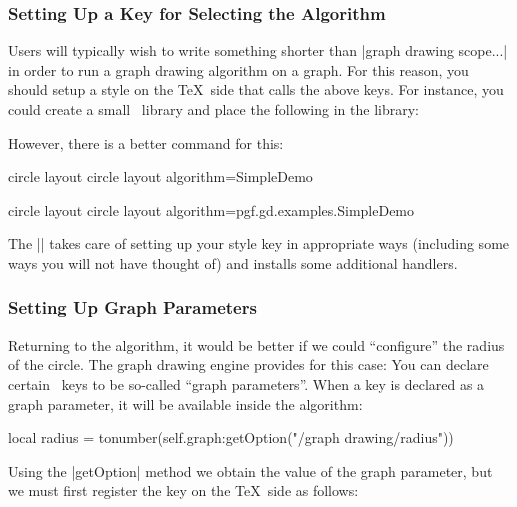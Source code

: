 \subsubsection{Setting Up a Key for Selecting the Algorithm}

Users will typically wish to write something shorter than
|graph drawing scope...| in order to run a graph drawing algorithm on
a graph. For this reason, you should setup a style on the \TeX\ side
that calls the above keys. For instance, you could create a small
\tikzname\ library and place the following in the library:

\begin{codeexample}
\end{codeexample}

However, there is a better command for this:

\begin{codeexample}[code only]
\pgfgddeclarealgorithmkey
{circle layout}
{circle layout}
{algorithm=SimpleDemo}
\end{codeexample}
\pgfgddeclarealgorithmkey
{circle layout}
{circle layout}
{algorithm=pgf.gd.examples.SimpleDemo}

The |\pgfgddeclarealgorithmkey| takes care of setting up your style
key in appropriate ways (including some ways you will not have thought
of) and installs some additional handlers.


\subsubsection{Setting Up Graph Parameters}

Returning to the algorithm, it would be better if we could
``configure'' the radius of the circle. The graph drawing engine
provides for this case: You can declare certain \pgfname\ keys to be
so-called ``graph parameters''. When a key is declared as a graph
parameter, it will be available inside the algorithm: 

\begin{codeexample}
local radius = tonumber(self.graph:getOption("/graph drawing/radius"))
\end{codeexample}

Using the |getOption| method we obtain the value of the
graph parameter, but we must first register the key on the \TeX\ side
as follows: 

